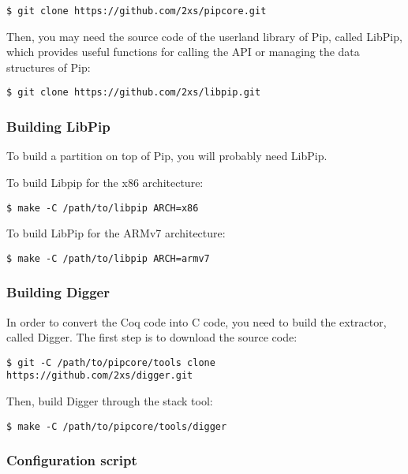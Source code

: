 \documentclass[10pt,a4paper,titlepage]{refart}
\begin{document}
\begin{lstlisting}[style=BashStyle]
    $ git clone https://github.com/2xs/pipcore.git
\end{lstlisting}

Then, you may need the source code of the userland library of Pip, called
LibPip, which provides useful functions for calling the API or managing the data
structures of Pip:

\begin{lstlisting}[style=BashStyle]
    $ git clone https://github.com/2xs/libpip.git
\end{lstlisting}

\subsubsection{Building LibPip}

To build a partition on top of Pip, you will probably need LibPip.

To build Libpip for the x86 architecture:

\begin{lstlisting}[style=BashStyle]
    $ make -C /path/to/libpip ARCH=x86
\end{lstlisting}

To build LibPip for the ARMv7 architecture:

\begin{lstlisting}[style=BashStyle]
    $ make -C /path/to/libpip ARCH=armv7
\end{lstlisting}

\subsubsection{Building Digger}

In order to convert the Coq code into C code, you need to build the extractor,
called Digger. The first step is to download the source code:

\begin{lstlisting}[style=BashStyle]
$ git -C /path/to/pipcore/tools clone https://github.com/2xs/digger.git
\end{lstlisting}

Then, build Digger through the stack tool:

\begin{lstlisting}[style=BashStyle]
    $ make -C /path/to/pipcore/tools/digger
\end{lstlisting}

\subsubsection{Configuration script}
\end{document}
